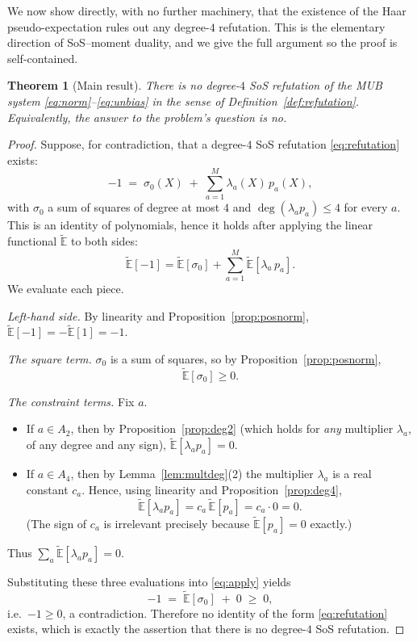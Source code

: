 \documentclass{amsart}
\newtheorem{theorem}{Theorem}
\theoremstyle{definition}
\begin{document}
We now show directly, with no further machinery, that the existence of the Haar
pseudo-expectation rules out any degree-$4$ refutation. This is the elementary direction of
SoS--moment duality, and we give the full argument so the proof is self-contained.

\begin{theorem}[Main result]\label{thm:main}
There is no degree-$4$ SoS refutation of the MUB system \eqref{eq:norm}--\eqref{eq:unbias} in
the sense of Definition~\ref{def:refutation}. Equivalently, the answer to the problem's
question is \emph{no}.
\end{theorem}

\begin{proof}
Suppose, for contradiction, that a degree-$4$ SoS refutation \eqref{eq:refutation} exists:
\[
-1\;=\;\sigma_0(X)\;+\;\sum_{a=1}^{M}\lambda_a(X)\,p_a(X),
\]
with $\sigma_0$ a sum of squares of degree at most $4$ and $\deg(\lambda_a p_a)\le4$ for every
$a$. This is an identity of polynomials, hence it holds after applying the linear functional
$\widetilde{\mathbb{E}}$ to both sides:
\begin{equation}\label{eq:apply}
\widetilde{\mathbb{E}}[-1]
=\widetilde{\mathbb{E}}[\sigma_0]
+\sum_{a=1}^{M}\widetilde{\mathbb{E}}[\lambda_a\,p_a].
\end{equation}
We evaluate each piece.

\smallskip
\noindent\emph{Left-hand side.} By linearity and Proposition~\ref{prop:posnorm},
$\widetilde{\mathbb{E}}[-1]=-\widetilde{\mathbb{E}}[1]=-1$.

\smallskip
\noindent\emph{The square term.} $\sigma_0$ is a sum of squares, so by
Proposition~\ref{prop:posnorm},
\[
\widetilde{\mathbb{E}}[\sigma_0]\ge 0 .
\]

\smallskip
\noindent\emph{The constraint terms.} Fix $a$.
\begin{itemize}
\item If $a\in A_2$, then by Proposition~\ref{prop:deg2} (which holds for \emph{any}
multiplier $\lambda_a$, of any degree and any sign), $\widetilde{\mathbb{E}}[\lambda_a p_a]=0$.
\item If $a\in A_4$, then by Lemma~\ref{lem:multdeg}(2) the multiplier $\lambda_a$ is a real
constant $c_a$. Hence, using linearity and Proposition~\ref{prop:deg4},
\[
\widetilde{\mathbb{E}}[\lambda_a p_a]=c_a\,\widetilde{\mathbb{E}}[p_a]=c_a\cdot 0=0 .
\]
(The sign of $c_a$ is irrelevant precisely because $\widetilde{\mathbb{E}}[p_a]=0$ exactly.)
\end{itemize}
Thus $\sum_{a}\widetilde{\mathbb{E}}[\lambda_a p_a]=0$.

\smallskip
Substituting these three evaluations into \eqref{eq:apply} yields
\[
-1\;=\;\widetilde{\mathbb{E}}[\sigma_0]\;+\;0\;\ge\;0 ,
\]
i.e.\ $-1\ge0$, a contradiction. Therefore no identity of the form \eqref{eq:refutation}
exists, which is exactly the assertion that there is no degree-$4$ SoS refutation. \qedhere
\end{proof}
\end{document}
